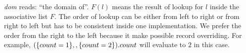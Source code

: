 
\textit{dom} reads: ``the domain of''. $ F(l) $ means the result of lookup for
$ l $ inside the associative list $ F $. The order of lookup can be either from
left to right or from right to left but has to be consistent inside one
implementation. We prefer the order from the right to the left because it make
possible record overriding. For example,
$ (\{ count = 1 \} ,, \{ count = 2 \}).count $ will evaluate to
$ 2 $ in this case.